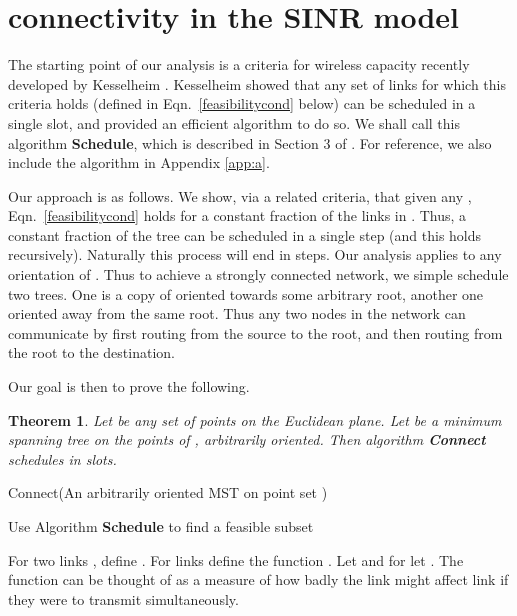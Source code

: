 \documentclass[11pt]{amsart}
\newcounter{foo}
\newtheorem{theorem}[foo]{Theorem}
\begin{document}
\section{ connectivity in the SINR model}
\label{sec:conn}

The starting point of our analysis is a criteria for wireless capacity
recently developed by Kesselheim \cite{KesselheimSoda11}. Kesselheim
showed that any set of links for which this criteria holds (defined in
Eqn.~\ref{feasibilitycond} below) can be scheduled in a single slot,
and provided an efficient algorithm to do so. We shall 
call this algorithm \textbf{Schedule}, which is described in Section 3 of
\cite{KesselheimSoda11}. 
For reference, 
we also include the algorithm in Appendix \ref{app:a}.

Our approach is as follows. We show, via a related criteria, that
given any , Eqn.~\ref{feasibilitycond} holds for
a constant fraction of the links in . Thus, a constant fraction of the
tree can be scheduled in a single step (and this holds
recursively). Naturally this process will end in 
steps. Our analysis applies to any orientation of . Thus to achieve
a strongly connected network, we simple schedule two trees. One is a
copy of  oriented towards some arbitrary root, another one oriented
away from the same root. Thus any two nodes in the network can
communicate by first routing from the source to the root, and then
routing from the root to the destination.

Our goal is then to prove the following.
\begin{theorem}
Let  be any set of points on the Euclidean plane. Let  be a minimum spanning tree on the points of ,
arbitrarily oriented. Then algorithm {\bf Connect} schedules  in  slots.
\label{mainth1}
\end{theorem}

\begin{algorithm}                      \caption{Connect(An arbitrarily oriented MST  on point set )}          \label{alg1}                           \begin{algorithmic}[1]                    \STATE 
     \WHILE{}
     	\STATE Use Algorithm \textbf{Schedule} to find a feasible subset  \label{alg:findfeasibleset}
	\STATE 
     \ENDWHILE
\end{algorithmic}
\label{alg1fig}
\end{algorithm}

For two links , define . For links  define
the function . Let  and for 
let . The function  can be thought of as a measure of how badly the link  might affect link  if
they were to transmit simultaneously.
\end{document}

